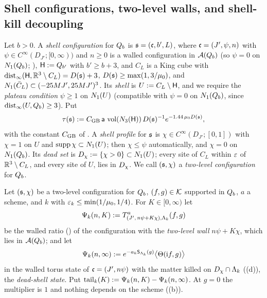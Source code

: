 \subsection{Shell configurations, two-level walls, and shell-kill decoupling}

\begin{definition}\label{rot:def:shell}
Let $b>0$. A \emph{shell configuration} for $Q_{b}$ is $\mathfrak s=(\mathfrak c,b',L)$, where $\mathfrak c=(J',\psi,n)$ with $\psi\in C^\infty(D_{J'};[0,\infty))$ and $n\ge0$ is a walled configuration in $\mathcal A(Q_{b})$ (so $\psi=0$ on $N_{1}(Q_{b})$; ), $\mathsf H:=Q_{b'}$ with $b'\ge b+3$, and $C_L$ is a King cube with $\operatorname{dist}_\infty(\mathsf H,\mathbb R^3\setminus C_L)=D(\mathfrak s)+3$, $D(\mathfrak s)\ge\max(1,3/\mu_0)$, and $N_{1}(\bar C_L)\subset(-25MJ',25MJ')^3$. Its \emph{shell} is $U:= C_L\setminus\mathsf H$, and we require the \emph{plateau condition} $\psi\ge1$ on $N_{1}(U)$ (compatible with $\psi=0$ on $N_{1}(Q_{b})$, since $\operatorname{dist}_\infty(U,Q_{b})\ge3$). Put
\begin{equation}\label{rot:eq:tau}
\tau(\mathfrak s):= C_{\rm GB}\,\mathsf a\,\operatorname{vol}(N_{3}(\mathsf H))\,D(\mathfrak s)^{-1}e^{-1.44\,\mu_0 D(\mathfrak s)},
\end{equation}
with the constant $C_{\rm GB}$ of . A \emph{shell profile} for $\mathfrak s$ is $\chi\in C^\infty(D_{J'};[0,1])$ with $\chi=1$ on $U$ and $\operatorname{supp}\chi\subset N_{1}(U)$; then $\chi\le\psi$ automatically, and $\chi=0$ on $N_{1}(Q_{b})$. Its \emph{dead set} is $D_\chi:=\{\chi>0\}\subset N_{1}(U)$; every site of $C_L$ within $\varepsilon$ of $\mathbb R^3\setminus C_L$, and every site of $U$, lies in $D_\chi$. We call $(\mathfrak s,\chi)$ a \emph{two-level configuration} for $Q_{b}$.
\end{definition}

\begin{definition}\label{rot:def:twolevel}
Let $(\mathfrak s,\chi)$ be a two-level configuration for $Q_{b}$, $(f,g)\in\mathcal K$ supported in $Q_{b}$, $a$ a scheme, and $k$ with $\varepsilon_k\le\min(1/\mu_0,1/4)$. For $K\in[0,\infty)$ let
\[
\Psi_k(n,K):=T^{a}_{(J',\,n\psi+K\chi),\Lambda_k}(f,g)
\]
be the walled ratio () of the configuration with the \emph{two-level wall} $n\psi+K\chi$, which lies in $\mathcal A(Q_{b})$; and let
\[
\Psi_k(n,\infty):= e^{-a_k\mathsf S_{\Lambda_k}(g)}\big\langle\Theta(\mathrm if,g)\big\rangle
\]
in the walled torus state of $\mathfrak c=(J',n\psi)$ with the matter killed on $D_\chi\cap\Lambda_k$ ((d)), the \emph{dead-shell state}. Put $\operatorname{tail}_k(K):=\Psi_k(n,K)-\Psi_k(n,\infty)$. At $g=0$ the multiplier is $1$ and nothing depends on the scheme ((b)).
\end{definition}

